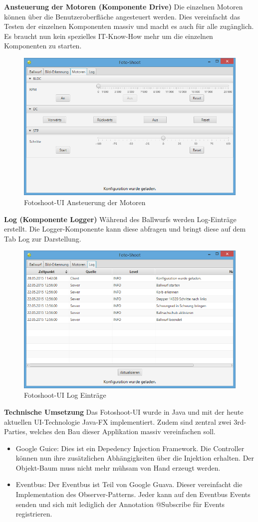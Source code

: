 \newpage
\noindent
\textbf{Ansteuerung der Motoren (Komponente Drive)}
Die einzelnen Motoren können über die Benutzeroberfläche angesteuert werden. Dies vereinfacht das Testen der einzelnen Komponenten massiv und macht es auch für alle zugänglich. Es braucht nun kein spezielles IT-Know-How mehr um die einzelnen Komponenten zu starten.

\begin{figure}[h!]
	\centering
	\includegraphics[width=0.6\linewidth]{../../fig/fotoshoot-ui/fotoshoot-ui-motoren}
	\caption{Fotoshoot-UI Ansteuerung der Motoren}
	\label{fig:fotoshoot-ui-motoren}
\end{figure}

\noindent
\textbf{Log (Komponente Logger)}
Während des Ballwurfs werden Log-Einträge erstellt. Die Logger-Komponente kann diese abfragen und bringt diese auf dem Tab Log zur Darstellung.

\begin{figure}[h!]
	\centering
	\includegraphics[width=0.6\linewidth]{../../fig/fotoshoot-ui/fotoshoot-ui-log}
	\caption{Fotoshoot-UI Log Einträge}
	\label{fig:fotoshoot-ui-log}
\end{figure}

\newpage
\noindent
\textbf{Technische Umsetzung}
Das Fotoshoot-UI wurde in Java und mit der heute aktuellen UI-Technologie Java-FX implementiert. Zudem sind zentral zwei 3rd-Parties, welches den Bau dieser Applikation massiv vereinfachen soll.

\begin{itemize}
	\item Google Guice: Dies ist ein Depedency Injection Framework. Die Controller können nun ihre zusätzlichen Abhängigkeiten über die Injektion erhalten. Der Objekt-Baum muss nicht mehr mühsam von Hand erzeugt werden.
	\item Eventbus: Der Eventbus ist Teil von Google Guava. Dieser vereinfacht die Implementation des Observer-Patterns. Jeder kann auf den Eventbus Events senden und sich mit lediglich der Annotation @Subscribe für Events registrieren.
\end{itemize}
	
